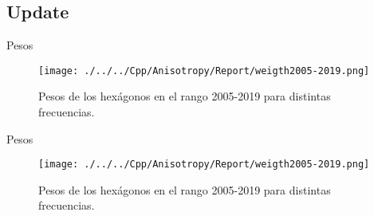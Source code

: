 \documentclass{beamer}
\begin{document}
\subsection{Update}


\begin{frame}{Pesos}

\begin{figure}[htbp]
	\centering
	\texttt{[image: ./../../Cpp/Anisotropy/Report/weigth2005-2019.png]}
	\caption{Pesos de los hexágonos en el rango 2005-2019 para distintas frecuencias.}
\end{figure}

\end{frame}

\begin{frame}{Pesos}

\begin{figure}[htbp]
	\centering
	\texttt{[image: ./../../Cpp/Anisotropy/Report/weigth2005-2019.png]}
	\caption{Pesos de los hexágonos en el rango 2005-2019 para distintas frecuencias.}
\end{figure}

\end{frame}
\end{document}
